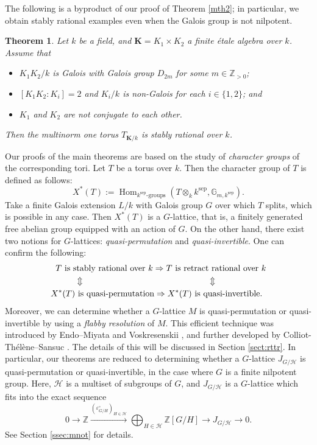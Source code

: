 \documentclass[12pt]{amsart}
\theoremstyle{plain}
\newtheorem{thm}{Theorem}[section]
\theoremstyle{definition}
\numberwithin{thm}{section}
\numberwithin{equation}{section}
\newcommand{\Zpn}{\mathbb{Z}_{>0}}
\newcommand{\Z}{\mathbb{Z}}
\newcommand{\G}{\mathbb{G}}
\newcommand{\bK}{\mathbf{K}}
\newcommand{\cH}{\mathcal{H}}
\DeclareMathOperator{\Hom}{Hom}
\DeclareMathOperator{\sep}{sep}
\begin{document}
The following is a byproduct of our proof of Theorem \ref{mth2}; in particular, we obtain stably rational examples even when the Galois group is not nilpotent.

\begin{thm}\label{mth4}
Let $k$ be a field, and $\bK=K_{1}\times K_{2}$ a finite {\'e}tale algebra over $k$. Assume that 
\begin{itemize}
    \item $K_{1}K_{2}/k$ is Galois with Galois group $D_{2m}$ for some $m\in \Zpn$; 
    \item $[K_{1}K_{2}:K_{i}]=2$ and $K_{i}/k$ is non-Galois for each $i\in \{1,2\}$; and
    \item $K_{1}$ and $K_{2}$ are not conjugate to each other. 
\end{itemize}
Then the multinorm one torus $T_{\bK/k}$ is stably rational over $k$. 
\end{thm}

Our proofs of the main theorems are based on the study of \emph{character groups} of the corresponding tori. Let $T$ be a torus over $k$. Then the character group of $T$ is defined as follows: 
\begin{equation*}
X^{*}(T):=\Hom_{k^{\sep}\text{-groups}}(T\otimes_{k}k^{\sep},\G_{m,k^{\sep}}). 
\end{equation*}
Take a finite Galois extension $L/k$ with Galois group $G$ over which $T$ splits, which is possible in any case. Then $X^{*}(T)$ is a $G$-lattice, that is, a finitely generated free abelian group equipped with an action of $G$. On the other hand, there exist two notions for $G$-lattices: \emph{quasi-permutation} and \emph{quasi-invertible}. One can confirm the following: 
\begin{align*}
T\textrm{ is stably rational over }k
\Rightarrow T\textrm{ is retract rational over }k
\\
\Updownarrow\hspace*{150pt} \Updownarrow\hspace*{60pt}  \\
X^{*}(T)\textrm{ is quasi-permutation} 
\Rightarrow
X^{*}(T)\textrm{ is quasi-invertible. }
\end{align*}
Moreover, we can determine whether a $G$-lattice $M$ is quasi-permutation or quasi-invertible by using a \emph{flabby resolution} of $M$. This efficient technique was introduced by Endo--Miyata \cite{Endo1975} and Voskresenskii \cite{Voskresenskii1969}, and further developed by Colliot-Th{\'e}l{\`e}ne--Sansuc \cite{ColliotThelene1977}. 
The details of this will be discussed in Section \ref{sect:rttr}. In particular, our theorems are reduced to determining whether a $G$-lattice $J_{G/\cH}$ is quasi-permutation or quasi-invertible, in the case where $G$ is a finite nilpotent group. Here, $\cH$ is a multiset of subgroups of $G$, and $J_{G/\cH}$ is a $G$-lattice which fits into the exact sequence
\begin{equation*}
    0\rightarrow \Z \xrightarrow{(\varepsilon_{G/H}^{\circ})_{H\in \cH}} \bigoplus_{H\in \cH}\Z[G/H] \rightarrow J_{G/\cH} \rightarrow 0. 
\end{equation*}
See Section \ref{ssec:mnot} for details. 
\end{document}
